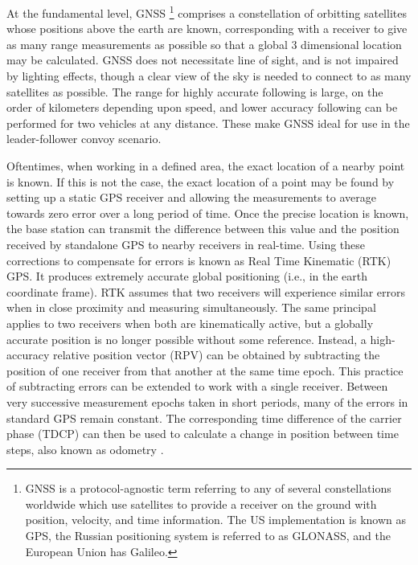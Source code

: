 \documentclass[12pt]{report}
\begin{document}
At the fundamental level, GNSS
\footnote{GNSS is a protocol-agnostic term referring to any of several constellations worldwide which use satellites to provide a receiver on the ground with position, velocity, and time information. The US implementation is known as GPS, the Russian positioning system is referred to as GLONASS, and the European Union has Galileo.}
comprises a constellation of orbitting satellites whose positions above the earth are known, corresponding with a receiver to give as many range measurements as possible so that a global 3 dimensional location may be calculated. GNSS does not necessitate line of sight, and is not impaired by lighting effects, though a clear view of the sky is needed to connect to as many satellites as possible. The range for highly accurate following is large, on the order of kilometers depending upon speed, and lower accuracy following can be performed for two vehicles at any distance. These make GNSS ideal for use in the leader-follower convoy scenario.

Oftentimes, when working in a defined area, the exact location of a nearby point is known. If this is not the case, the exact location of a point may be found by setting up a static GPS receiver and allowing the measurements to average towards zero error over a long period of time. Once the precise location is known, the base station can transmit the difference between this value and the position received by standalone GPS to nearby receivers in real-time. Using these corrections to compensate for errors is known as Real Time Kinematic (RTK) GPS. It produces extremely accurate global positioning (i.e., in the earth coordinate frame).
RTK assumes that two receivers will experience similar errors when in close proximity and measuring simultaneously. The same principal applies to two receivers when both are kinematically active, but a globally accurate position is no longer possible without some reference. Instead, a high-accuracy relative position vector (RPV) can be obtained by subtracting the position of one receiver from that another at the same time epoch.
This practice of subtracting errors can be extended to work with a single receiver. Between very successive measurement epochs taken in short periods, many of the errors in standard GPS remain constant. The corresponding time difference of the carrier phase (TDCP) can then be used to calculate a change in position between time steps, also known as odometry \cite{travisdiss}.
\end{document}
